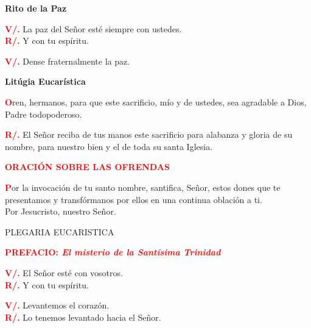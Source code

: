 \documentclass[12pt, letterpaper]{report}
\begin{document}
  \begin{center}
    \Huge {\bfseries Rito de la Paz}
  \end{center}

  \noindent
  \Large {\bfseries \textcolor{red}{V/.}} \hspace{0.5cm} La paz del Se\~nor est\'e siempre con ustedes.\\
  \Large {\bfseries \textcolor{red}{R/.}} \hspace{0.5cm} Y con tu esp\'iritu. 
  
  \noindent
  \Large {\bfseries \textcolor{red}{V/.}} \hspace{0.5cm} Dense fraternalmente la paz.
  
  \clearpage

  \begin{center}
    \Huge {\bfseries Lit\'ugia Eucar\'istica}
  \end{center}

  \Large \lettrine[lines=2]{\bfseries \textcolor{red}{O}}{}ren, hermanos, para que este sacrificio, m\'io y de ustedes, sea agradable a Dios, Padre todopoderoso.
  
  \Large {\bfseries \textcolor{red}{R/.}} El Se\~nor reciba de tus manos este sacrificio para alabanza y gloria de su nombre, para nuestro bien y el de toda su santa Iglesia.

  \Large {\bfseries \textcolor{red}{ORACI\'ON SOBRE LAS OFRENDAS}}

  \Large \lettrine[lines=2]{\bfseries \textcolor{red}{P}}{}or la invocaci\'on de tu santo nombre, santifica, Se\~nor, estos dones que te presentamos y transf\'ormanos por ellos en una continua oblaci\'on a ti.\\
  Por Jesucristo, nuestro Se\~nor.

  \begin{center}
  \Large PLEGARIA EUCARISTICA
  \end{center}

  \Large {\bfseries \textcolor{red}{PREFACIO: \em \large El misterio de la Sant\'isima Trinidad}}

  \noindent
  \Large {\bfseries \textcolor{red}{V/.}} \hspace{0.5cm} El Se\~nor est\'e con vosotros. \\
  \Large {\bfseries \textcolor{red}{R/.}} \hspace{0.5cm} Y con tu esp\'iritu.

  \noindent
  \Large {\bfseries \textcolor{red}{V/.}} \hspace{0.5cm} Levantemos el coraz\'on. \\
  \Large {\bfseries \textcolor{red}{R/.}} \hspace{0.5cm} Lo tenemos levantado hacia el Se\~nor.
\end{document}
